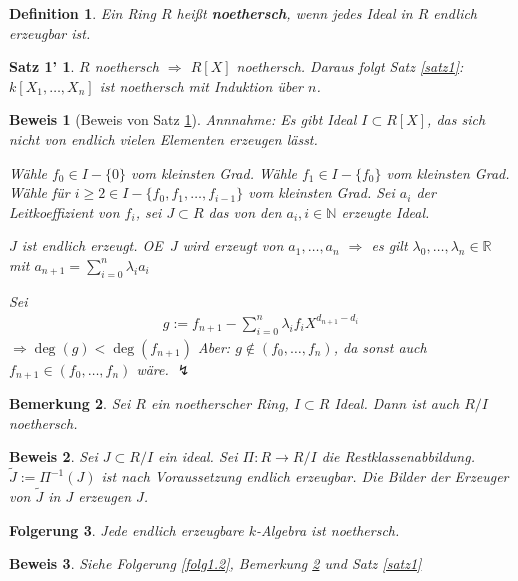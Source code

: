 \documentclass[a4paper, 12pt, numbers=noendperiod, chapterprefix=true, headsepline]{scrbook}
\theoremstyle{break}
\newtheorem{Def}{Definition}[section]
\newtheorem{Bem}[Def]{Bemerkung}
\newtheorem{Folg}[Def]{Folgerung}
\theoremstyle{nonumberbreak}
\newtheorem{nnSatz1}{Satz 1'} %
\newtheorem{Bew}{Beweis}
\theoremstyle{nonumberplain}
\newcommand{\emp}[1]{\textbf{\emph{#1}}}
\newcommand{\defterm}[1]{{\index{#1}}\emp{#1}}
\newcommand{\R}{\mathbb{R}}
\newcommand{\N}{\mathbb{N}}
\renewcommand{\OE}{O\!\!E~}
\begin{document}
\begin{Def}
Ein Ring $R$ hei\ss t \defterm{noethersch}, wenn jedes Ideal in $R$ endlich erzeugbar ist.
\end{Def}

\begin{nnSatz1}\label{satz1'}
$R$ noethersch $\Rightarrow$ $R[X]$ noethersch. Daraus folgt Satz \ref{satz1}: $k[X_1,\dots ,X_n]$ ist noethersch mit Induktion \"uber $n$.
\end{nnSatz1}

\begin{Bew}[Beweis von Satz \ref{satz1'}]
\emph{Annnahme:} Es gibt Ideal $I\subset R[X]$, das sich nicht von endlich vielen Elementen erzeugen l\"asst.

W\"ahle $f_0 \in I-\{0\}$ vom kleinsten Grad. W\"ahle $f_1 \in I-\{f_0\}$ vom kleinsten Grad. W\"ahle f\"ur $i\ge2\in I-\{f_0,f_1,\dots ,f_{i-1}\}$ vom kleinsten Grad. Sei $a_i$ der Leitkoeffizient von $f_i$, sei $J\subset R$ das von den $a_i,i\in \N$ erzeugte Ideal.

$J$ ist endlich erzeugt. \OE $J$ wird erzeugt von $a_1,\dots ,a_n$ $\Rightarrow$ es gilt $\lambda_0,\dots ,\lambda_n \in \R$ mit $a_{n+1}=\sum_{i=0}^n\lambda_i a_i$

Sei \begin{align*}g:= f_{n+1}-\sum_{i=0}^n \lambda_i f_i X^{d_{n+1}-d_i}\end{align*} $\Rightarrow \deg(g) <\deg(f_{n+1})$ \emph{Aber}: $g\notin (f_0,\dots ,f_n)$, da sonst auch $f_{n+1} \in(f_0,\dots ,f_n)$ w\"are. $\lightning$
\end{Bew}

\begin{Bem}\label{bem1.8}
Sei $R$ ein noetherscher Ring, $I\subset R$ Ideal. Dann ist auch $R/I$ noethersch.
\end{Bem}

\begin{Bew}
Sei $J \subset R/I$ ein ideal. Sei $\Pi:R \to R/I$ die Restklassenabbildung. $\tilde{J} := \Pi^{-1}(J)$ ist nach Voraussetzung endlich erzeugbar. Die Bilder der Erzeuger von $\tilde{J}$ in $J$ erzeugen $J$.
\end{Bew}

\begin{Folg}
Jede endlich erzeugbare $k$-Algebra ist noethersch.
\end{Folg}

\begin{Bew}
Siehe Folgerung \ref{folg1.2}, Bemerkung \ref{bem1.8} und Satz \ref{satz1}
\end{Bew}
\end{document}
